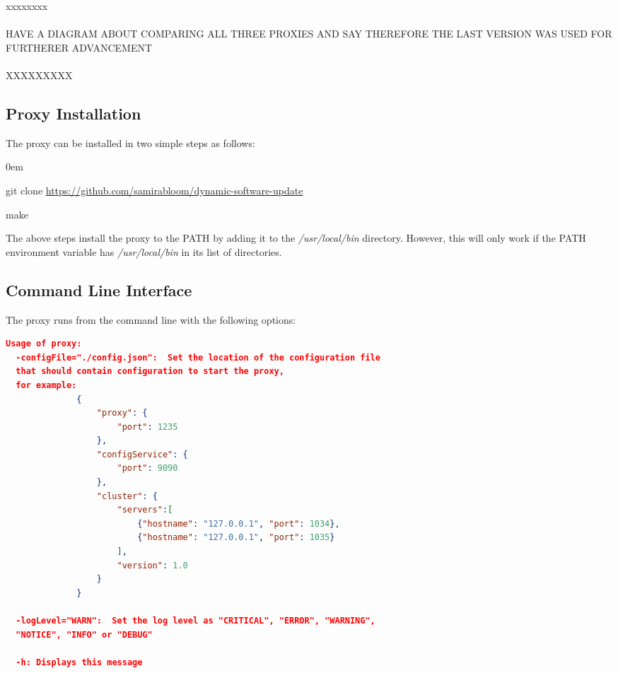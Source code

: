 \documentclass[a4paper,11pt,twoside]{article}
\begin{document}
xxxxxxxx\\\\
HAVE A DIAGRAM ABOUT COMPARING ALL THREE PROXIES AND SAY THEREFORE THE LAST VERSION WAS USED FOR FURTHERER ADVANCEMENT\\\\

XXXXXXXXX\\



\subsection{Proxy Installation}
The proxy can be installed in two simple steps as follows:
\begin{list}{-}{}
  \itemsep0em
  \item git clone \url {https://github.com/samirabloom/dynamic-software-update} 
  \item make
\end{list}

\noindent
The above steps install the proxy to the PATH by adding it to the \textit{/usr/local/bin} directory. However, this will only work if the PATH environment variable has \textit{/usr/local/bin} in its list of directories. 

\subsection{Command Line Interface}
The proxy runs from the command line with the following options:\\

\begin{lstlisting}[language=json,firstnumber=1]
Usage of proxy:
  -configFile="./config.json":  Set the location of the configuration file 
  that should contain configuration to start the proxy, 
  for example:
              {
                  "proxy": {
                      "port": 1235
                  },
                  "configService": {
                      "port": 9090
                  },
                  "cluster": {
                      "servers":[
                          {"hostname": "127.0.0.1", "port": 1034},
                          {"hostname": "127.0.0.1", "port": 1035}
                      ],
                      "version": 1.0
                  }
              }

  -logLevel="WARN":  Set the log level as "CRITICAL", "ERROR", "WARNING", 
  "NOTICE", "INFO" or "DEBUG"

  -h: Displays this message
\end{lstlisting} 
\end{document}
